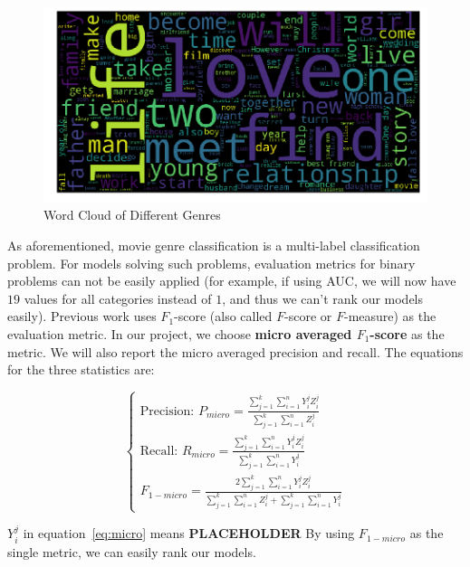 \documentclass[12pt]{article} %
\newcommand{\plh}{\textbf{\color{red} PLACEHOLDER }}
\begin{document}
\begin{figure}[H]
\begin{minipage}{0.5\textwidth}
\begin{minipage}{\textwidth}
  \end{minipage}
  \begin{minipage}{\textwidth}
    \centering
    \includegraphics[width=\linewidth]{wordcloud1.png}
  \end{minipage}
  \caption{Word Cloud of Different Genres}
   \label{fig:word-cloud}
\end{minipage}%
\end{figure}

As aforementioned, movie genre classification is a multi-label classification problem. For models solving such problems, evaluation metrics for binary problems can not be easily applied (for example, if using AUC, we will now have $19$ values for all categories instead of $1$, and thus we can't rank our models easily). Previous work \cite{multilabel,multilabel1,multilabel2} uses $F_1$-score (also called $F$-score or $F$-measure) as the evaluation metric. In our project, we choose {\bf micro averaged $F_1$-score} \cite{multilabel} as the metric. We will also report the micro averaged precision and recall. The equations for the three statistics are:

\begin{equation} \label{eq:micro}
\begin{cases}
\text{Precision: }P_{micro}=\frac{\sum_{j=1}^k\sum_{i=1}^nY_i^jZ_i^j}{\sum_{j=1}^k\sum_{i=1}^nZ_i^j}\\
\text{Recall: }R_{micro}=\frac{\sum_{j=1}^k\sum_{i=1}^nY_i^jZ_i^j}{\sum_{j=1}^k\sum_{i=1}^nY_i^j}\\
F_{1-micro} = \frac{2\sum_{j=1}^k\sum_{i=1}^nY_i^jZ_i^j}{\sum_{j=1}^k\sum_{i=1}^nZ_i^j+\sum_{j=1}^k\sum_{i=1}^nY_i^j}
\end{cases}
\end{equation}

$Y_i^j$ in equation~\ref{eq:micro} means \plh By using $F_{1-micro}$ as the single metric, we can easily rank our models.
\end{document}
